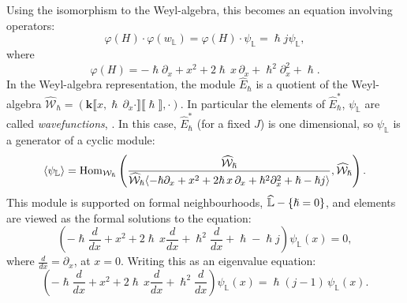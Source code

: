     
    Using the isomorphism to the Weyl-algebra, this becomes an equation involving operators:
    \begin{equation} \varphi(H) \cdot \varphi(w_{\mathbb{L}}) = \varphi(H) \cdot \psi_{\mathbb{L}} = \hslash j \psi_{\mathbb{L}},
    \end{equation}
    where 
    \[ \varphi(H)  = - \hslash \partial_x +  x^2 + 2  \hslash\, x \, \partial_x + \hslash^2  \partial^2_x + \hslash. \]
    In the Weyl-algebra representation, the module \(\widehat{E}_{\hslash}\) is a quotient of the Weyl-algebra \( \widehat{\mathcal{W}}_{\hslash} =  (\mathbf{k} \lBrack x, \hslash \, \partial_x \cdot \rBrack \lBrack \hslash \rBrack ,\cdot) \). In particular the elements of \( \widehat{E}_{\hslash}^*\), \( \psi_{\mathbb{L}}\) are called   \emph{wavefunctions}, \cite[page 13]{ks_airy}. In this case, \( \widehat{E}_{\hslash}^*\) (for a fixed \(J\)) is one dimensional, so \( \psi_{\mathbb{L}}\) is a generator of a cyclic module:
    \[ \langle \psi_{\mathbb{L}} \rangle = \mathrm{Hom}_{\mathcal{W}_{\hslash}}\left(  \frac{\widehat{\mathcal{W}}_{\hslash}}{\widehat{\mathcal{W}}_{\hslash} \langle - \hslash \partial_x +  x^2 + 2  \hslash\, x \, \partial_x + \hslash^2  \partial^2_x + \hslash - \hslash j  \rangle }, \widehat{\mathcal{W}}_{\hslash} \right).\] 
    This module is supported on formal neighbourhoods, \( \widehat{\mathbb{L}}-\{\hslash=0\}\), and elements are viewed as the formal solutions to the equation: 
    \begin{equation} 
    \label{eqn:quant_conic}
    \left( - \hslash \frac{d}{d x} +  x^2 + 2  \hslash\, x \frac{ d }{d x}+ \hslash^2  \frac{d}{d x}  + \hslash - \hslash j\right) \psi_{\mathbb{L}}(x)  = 0, 
    \end{equation}
    where \(  \frac{d}{dx} = \partial_x\), at \(x=0\). Writing this as an eigenvalue equation:
    \[ \left(- \hslash \frac{d}{d x} +  x^2 + 2  \hslash\, x \frac{ d }{d x}+ \hslash^2  \frac{d}{d x} \right) \psi_{\mathbb{L}}(x)  = \hslash ( j -1) \, \psi_{\mathbb{L}}(x). \]
